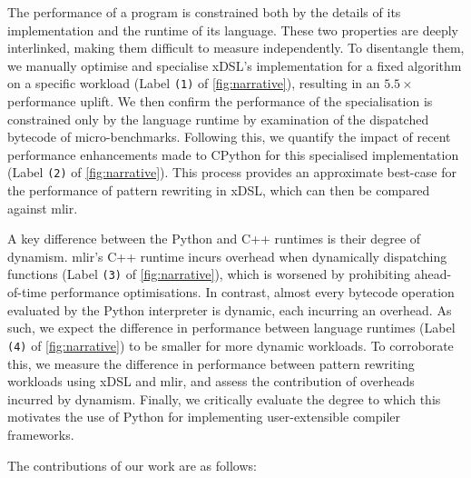 The performance of a program is constrained both by the details of its implementation and the runtime of its language.
These two properties are deeply interlinked, making them difficult to measure independently.
To disentangle them, we manually optimise and specialise xDSL's implementation for a fixed algorithm on a specific workload (Label \texttt{(1)} of \autoref{fig:narrative}), resulting in an $5.5\times$ performance uplift. %
We then confirm the performance of the specialisation is constrained only by the language runtime by examination of the dispatched bytecode of micro-benchmarks.
Following this, we quantify the impact of recent performance enhancements made to CPython for this specialised implementation (Label \texttt{(2)} of \autoref{fig:narrative}). %
This process provides an approximate best-case for the performance of pattern rewriting in xDSL, which can then be compared against \ac{mlir}.




A key difference between the Python and C++ runtimes is their degree of dynamism.
\ac{mlir}'s C++ runtime incurs overhead when dynamically dispatching functions (Label \texttt{(3)} of \autoref{fig:narrative}), which is worsened by prohibiting ahead-of-time performance optimisations. In contrast, almost every bytecode operation evaluated by the Python interpreter is dynamic, each incurring an overhead.
As such, we expect the difference in performance between language runtimes (Label \texttt{(4)} of \autoref{fig:narrative}) to be smaller for more dynamic workloads.
To corroborate this, we measure the difference in performance between pattern rewriting workloads using xDSL and \ac{mlir}, and assess the contribution of overheads incurred by dynamism.
Finally, we critically evaluate the degree to which this motivates the use of Python for implementing user-extensible compiler frameworks.



The contributions of our work are as follows:

